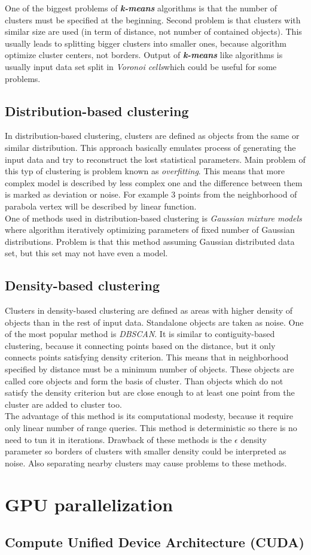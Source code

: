 One of the biggest problems of \textit{\textbf{k-means}} algorithms is that the number of clusters must be specified at the beginning. Second problem is that clusters with similar size are used (in term of distance, not number of contained objects). This usually leads to splitting bigger clusters into smaller ones, because algorithm optimize cluster centers, not borders.
Output of \textit{\textbf{k-means}} like algorithms is usually input data set split in \textit{Voronoi cells}which could be useful for some problems.

\subsection{Distribution-based clustering} \label{ssec:distributionClustering}
In distribution-based clustering, clusters are defined as objects from the same or similar distribution. This approach basically emulates process of generating the input data and try to reconstruct the lost statistical parameters. Main problem of this typ of clustering is problem known as \textit{overfitting}. This means that more complex model is described by less complex one and the difference between them is marked as deviation or noise. For example 3 points from the neighborhood of parabola vertex will be described by linear function.\\
One of methods used in distribution-based clustering is \textit{Gaussian mixture models} where algorithm iteratively optimizing parameters of fixed number of Gaussian distributions.
Problem is that this method assuming Gaussian distributed data set, but this set may not have even a model.

\subsection{Density-based clustering} \label{ssec:densityClustering} 
 Clusters in density-based clustering are defined as areas with higher density of objects than in the rest of input data. Standalone objects are taken as noise. One of the most popular method is \textit{DBSCAN}. It is similar to contiguity-based clustering, because it connecting points based on the distance, but it only connects points satisfying density criterion. This means that in neighborhood specified by distance must be a minimum number of objects. These objects are called core objects and form the basis of cluster. Than objects which do not satisfy the density criterion but are close enough to at least one point from the cluster are added to cluster too.\\
The advantage of this method is its computational modesty, because it require only linear number of range queries. This method is deterministic so there is no need to tun it in iterations.
Drawback of these methods is the $\epsilon$ density parameter so borders of clusters with smaller density could be interpreted as  noise. Also separating nearby clusters may cause problems to these methods.
 
\section{GPU parallelization}
\subsection{Compute Unified Device Architecture (CUDA)}